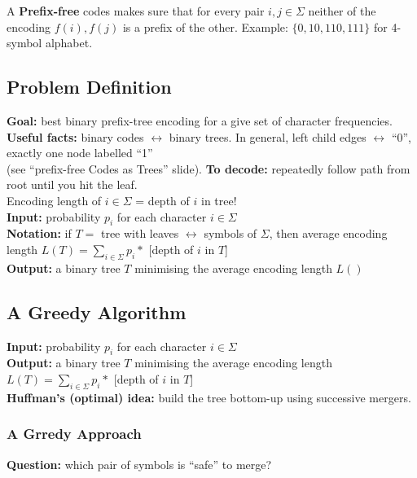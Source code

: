 \documentclass{scrartcl}
\begin{document}
A {\bf Prefix-free } codes makes sure that for every pair $i, j \in \Sigma$
neither of the encoding $f(i), f(j)$ is a prefix of the other. Example: $\{0,
10, 110, 111\}$ for 4-symbol alphabet.
\subsection{Problem Definition}
\label{sec:7-2} {\bf Goal: } best binary prefix-tree encoding for a give set of
character
frequencies. \\
{\bf Useful facts: } binary codes $\leftrightarrow$ binary trees. In general,
left child edges $\leftrightarrow$ ``0'', exactly one node labelled ``1''\\
(see ``prefix-free Codes as Trees'' slide).
{\bf To decode: }  repeatedly follow path from root until you hit the leaf.\\
Encoding length of $i \in \Sigma$ = depth of $i$ in tree!\\

{\bf Input: } probability $p_i$ for each character $i \in \Sigma$\\

{\bf Notation: } if $T = $ tree with leaves $\leftrightarrow$ symbols of
$\Sigma$, then average encoding length $L(T) = \sum \limits_{i \in \Sigma} p_i
*$ [depth of $i$ in $T$]\\

{\bf Output: } a binary tree $T$ minimising the average encoding length $L()$
\subsection{A Greedy Algorithm}
\label{sec:7-3}

{\bf Input: } probability $p_i$ for each character $i \in \Sigma$\\

{\bf Output: } a binary tree $T$ minimising the average encoding length $L(T) =
\sum \limits_{i \in \Sigma} p_i *$ [depth of $i$ in $T$]\\

{\bf Huffman's (optimal) idea: } build the tree bottom-up using successive
mergers.

\subsubsection{A Grredy Approach}
\label{sec:7-3-1}

{\bf Question: } which pair of symbols is ``safe'' to merge?
\end{document}
